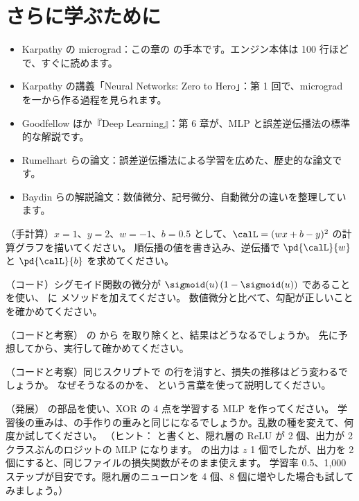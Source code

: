 \section*{さらに学ぶために}

\begin{itemize}
\item Karpathy の micrograd\cite{karpathy2022micrograd}：この章の  の手本です。エンジン本体は 100 行ほどで、すぐに読めます。
\item Karpathy の講義「Neural Networks: Zero to Hero」\cite{karpathy2022zerotohero}：第 1 回で、micrograd を一から作る過程を見られます。
\item Goodfellow ほか『Deep Learning』\cite{goodfellow2016deep}：第 6 章が、MLP と誤差逆伝播法の標準的な解説です。
\item Rumelhart らの論文\cite{rumelhart1986learning}：誤差逆伝播法による学習を広めた、歴史的な論文です。
\item Baydin らの解説論文\cite{baydin2018automatic}：数値微分、記号微分、自動微分の違いを整理しています。
\end{itemize}

\begin{exercises}
\item （手計算）$x=1$、$y=2$、$w=-1$、$b=0.5$ として、$\calL=(wx+b-y)^2$ の計算グラフを描いてください。
順伝播の値を書き込み、逆伝播で $\pd{\calL}{w}$ と $\pd{\calL}{b}$ を求めてください。
\item （コード）シグモイド関数の微分が $\sigmoid(u)\,(1-\sigmoid(u))$ であることを使い、 に  メソッドを加えてください。
数値微分と比べて、勾配が正しいことを確かめてください。
\item （コードと考察） の  から  を取り除くと、結果はどうなるでしょうか。
先に予想してから、実行して確かめてください。
\item （コードと考察）同じスクリプトで  の行を消すと、損失の推移はどう変わるでしょうか。
なぜそうなるのかを、\code{+=} という言葉を使って説明してください。
\item （発展） の部品を使い、XOR の 4 点を学習する MLP を作ってください。
学習後の重みは、の手作りの重みと同じになるでしょうか。乱数の種を変えて、何度か試してください。
（ヒント： と書くと、隠れ層の ReLU が 2 個、出力が 2 クラスぶんのロジットの MLP になります。
の出力は $z$ 1 個でしたが、出力を 2 個にすると、同じファイルの損失関数がそのまま使えます。
学習率 0.5、1,000 ステップが目安です。隠れ層のニューロンを 4 個、8 個に増やした場合も試してみましょう。）
\end{exercises}
